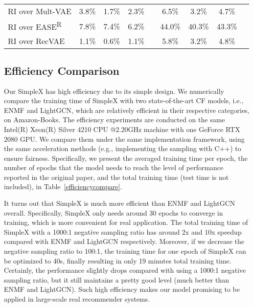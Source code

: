 \documentclass[sigconf,authorversion]{acmart}
\begin{document}
\begin{table*}[htbp]
\begin{tabular}{c|cccc|cccc}
    \\ \hline
\multicolumn{1}{l|}{RI over Mult-VAE}                & 3.8\%                         & 1.7\%                         & \multicolumn{1}{c|}{2.3\%}    &   
      & 6.5\%                         & 3.2\%                         & \multicolumn{1}{c|}{4.7\%}    &  
\\
\multicolumn{1}{l|}{RI over EASE\textsuperscript{R}} & 7.8\%                         & 7.4\%                         & \multicolumn{1}{c|}{6.2\%}    &   
 & 44.0\%                         & 40.3\%                         & \multicolumn{1}{c|}{43.3\%}    &          
\\ 
\multicolumn{1}{l|}{RI over RecVAE} & 1.1\%                         & 0.6\%                         & \multicolumn{1}{c|}{1.1\%}    &   
 & 5.8\%                         & 3.2\%                         & \multicolumn{1}{c|}{4.8\%}    &          
\\ 
\hline
\end{tabular}
\label{fullresults3}
\end{table*}






\subsection{Efficiency Comparison}
Our SimpleX has high efficiency due to its simple design. We numerically compare the training time of SimpleX with two state-of-the-art CF models, i.e., ENMF and LightGCN, which are relatively efficient in their respective categories, on Amazon-Books. 
The efficiency experiments are conducted on the same Intel(R) Xeon(R) Silver 4210 CPU @2.20GHz machine with one GeForce RTX 2080 GPU.
We compare them under the same implementation framework, using the same acceleration methods (e.g., implementing the sampling with C++) to ensure fairness.
Specifically, we present the averaged training time per epoch, the number of epochs that the model needs to reach the level of performance reported in the original paper, and the total training time (test time is not included), in Table~\ref{efficiencycompare}.





It turns out that SimpleX is much more efficient than ENMF and LightGCN overall.
Specifically, SimpleX only needs around 30 epochs to converge in training, which is more convenient for real application.
The total training time of SimpleX with a 1000:1 negative sampling ratio has around 2x and 10x speedup compared with ENMF and LightGCN respectively. Moreover, if we decrease the negative sampling ratio to 100:1, the training time for one epoch of SimpleX can be optimized to 40s, finally resulting in only 19 minutes total training time. Certainly, the performance slightly drops compared with using a 1000:1 negative sampling ratio, but it still maintains a pretty good level (much better than ENMF and LightGCN). Such high efficiency makes our model promising to be applied in large-scale real recommender systems.
\end{document}
